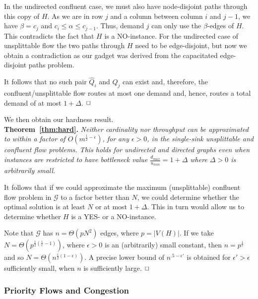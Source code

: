 \documentclass[12pt]{article}
\def\a{\alpha}
\def\b{\beta}
\newcommand{\qed}{$\hfill{\Box}$}
\newcommand{\capp}[1]{c_{#1}}
\begin{document}
In the undirected confluent case, we must also have node-disjoint paths through this copy of $H$.
 As we are in row $j$ and a column between column $i$ and $j-1$,
we have $\b=\capp{j}$ and $\capp{i} \le \a \le \capp{j-1}$. Thus, demand $j$ can only use the $\b$-edges of $H$.
This contradicts the fact that $H$ is a NO-instance. For the undirected case of unsplittable flow the two
paths through $H$ need to be edge-disjoint, but now we obtain a contradiction as
our gadget was derived from the
capacitated edge-disjoint paths problem.

It follows that no such pair $\hat{Q}_i$ and $\hat{Q}_j$ can exist and, therefore, the confluent/unsplittable flow routes at
most one demand and, hence, routes a total demand of at most $1+\Delta$.
\qed

We then obtain our hardness result. \\

{{\noindent\bf Theorem~\ref{thm:hard}.} \itshape
Neither cardinality nor throughput can be approximated to
within a factor of $O(m^{\frac12-\epsilon})$, for any
$\epsilon > 0$, in the single-sink unsplittable and confluent flow problems.
This holds for  undirected and directed graphs even
when instances are restricted to have bottleneck value
$\frac{d_{max}}{u_{min}}=1 + \Delta$ where $\Delta  > 0$ is arbitrarily small.\\
}

 It follows that if we could
approximate the maximum (unsplittable) confluent flow problem in $\mathcal{G}$ to a
factor better than $N$, we could determine whether the optimal solution is
at least $N$ or at most $1+\Delta$. This in turn would allow us to determine whether $H$ is a YES-
or a NO-instance.

Note that $\mathcal{G}$ has $n=\Theta(pN^2)$ edges, where $p=|V(H)|$. If we
take $N = \Theta(p^{\frac12(\frac{1}{\epsilon}-1)})$, where $\epsilon>0$ is an (arbitrarily)
small constant, then $n=p^{\frac{1}{\epsilon}}$ and so
$N = \Theta(n^{\frac12 (1-\epsilon)})$.   A precise lower bound of $n^{.5 - \epsilon'}$ is obtained for
$\epsilon' > \epsilon$ sufficiently small, when $n$ is sufficiently large.
\qed



\subsubsection{Priority Flows and Congestion}
\label{sec:congestion}
\end{document}
